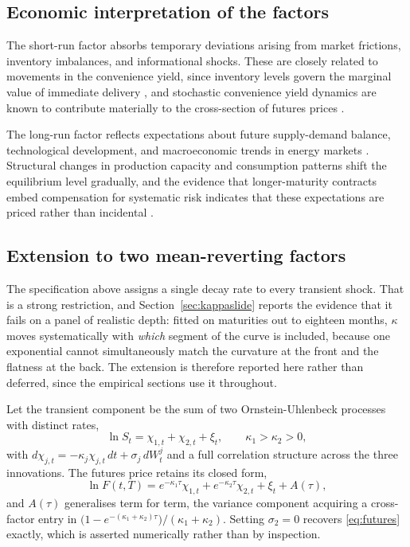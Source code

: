 \documentclass[journal]{IEEEtran}
\begin{document}
\subsection{Economic interpretation of the factors}

The short-run factor absorbs temporary deviations arising from market frictions, inventory imbalances, and informational shocks. These are closely related to movements in the convenience yield, since inventory levels govern the marginal value of immediate delivery \cite{GibsonSchwartz1990, KilianMurphy2014}, and stochastic convenience yield dynamics are known to contribute materially to the cross-section of futures prices \cite{CasassusCollinDufresne2005}.

The long-run factor reflects expectations about future supply-demand balance, technological development, and macroeconomic trends in energy markets \cite{Pindyck1999}. Structural changes in production capacity and consumption patterns shift the equilibrium level gradually, and the evidence that longer-maturity contracts embed compensation for systematic risk indicates that these expectations are priced rather than incidental \cite{HamiltonWu2014}.

\subsection{Extension to two mean-reverting factors}
\label{sec:threefactor}

The specification above assigns a single decay rate to every transient shock. That is a strong restriction, and Section~\ref{sec:kappaslide} reports the evidence that it fails on a panel of realistic depth: fitted on maturities out to eighteen months, $\kappa$ moves systematically with \emph{which} segment of the curve is included, because one exponential cannot simultaneously match the curvature at the front and the flatness at the back. The extension is therefore reported here rather than deferred, since the empirical sections use it throughout.

Let the transient component be the sum of two Ornstein-Uhlenbeck processes with distinct rates,
%
\begin{equation}
  \ln S_t = \chi_{1,t} + \chi_{2,t} + \xi_t ,
  \qquad
  \kappa_1 > \kappa_2 > 0 ,
  \label{eq:decomposition3}
\end{equation}
%
with $d\chi_{j,t} = -\kappa_j \chi_{j,t}\,dt + \sigma_j\,dW^j_t$ and a full correlation structure across the three innovations. The futures price retains its closed form,
%
\begin{equation}
  \ln F(t,T) = e^{-\kappa_1\tau}\chi_{1,t} + e^{-\kappa_2\tau}\chi_{2,t} + \xi_t + A(\tau) ,
  \label{eq:futures3}
\end{equation}
%
and $A(\tau)$ generalises term for term, the variance component acquiring a cross-factor entry in $\bigl(1-e^{-(\kappa_1+\kappa_2)\tau}\bigr)/(\kappa_1+\kappa_2)$. Setting $\sigma_2 = 0$ recovers \eqref{eq:futures} exactly, which is asserted numerically rather than by inspection.
\end{document}
